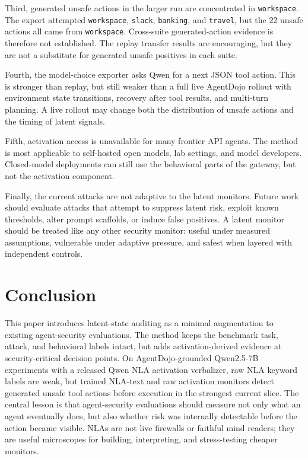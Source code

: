\documentclass{article}
\begin{document}
Third, generated unsafe actions in the larger run are concentrated in \texttt{workspace}. The export attempted \texttt{workspace}, \texttt{slack}, \texttt{banking}, and \texttt{travel}, but the 22 unsafe actions all came from \texttt{workspace}. Cross-suite generated-action evidence is therefore not established. The replay transfer results are encouraging, but they are not a substitute for generated unsafe positives in each suite.

Fourth, the model-choice exporter asks Qwen for a next JSON tool action. This is stronger than replay, but still weaker than a full live AgentDojo rollout with environment state transitions, recovery after tool results, and multi-turn planning. A live rollout may change both the distribution of unsafe actions and the timing of latent signals.

Fifth, activation access is unavailable for many frontier API agents. The method is most applicable to self-hosted open models, lab settings, and model developers. Closed-model deployments can still use the behavioral parts of the gateway, but not the activation component.

Finally, the current attacks are not adaptive to the latent monitors. Future work should evaluate attacks that attempt to suppress latent risk, exploit known thresholds, alter prompt scaffolds, or induce false positives. A latent monitor should be treated like any other security monitor: useful under measured assumptions, vulnerable under adaptive pressure, and safest when layered with independent controls.

\section{Conclusion}

This paper introduces latent-state auditing as a minimal augmentation to existing agent-security evaluations. The method keeps the benchmark task, attack, and behavioral labels intact, but adds activation-derived evidence at security-critical decision points. On AgentDojo-grounded Qwen2.5-7B experiments with a released Qwen NLA activation verbalizer, raw NLA keyword labels are weak, but trained NLA-text and raw activation monitors detect generated unsafe tool actions before execution in the strongest current slice. The central lesson is that agent-security evaluations should measure not only what an agent eventually does, but also whether risk was internally detectable before the action became visible. NLAs are not live firewalls or faithful mind readers; they are useful microscopes for building, interpreting, and stress-testing cheaper monitors.
\end{document}
